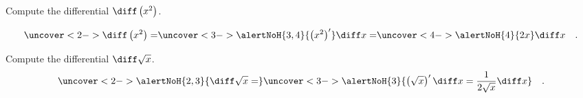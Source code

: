 \begin{frame}
\begin{example}
Compute the differential $\diff \left( x^2\right)$.

\[
\uncover<2->{\diff\left(x^2\right)=}\uncover<3->{ \alertNoH{3,4}{\left(x^2\right)'} \diff x=} \uncover<4->{\alertNoH{4}{2x} \diff x\quad .}
\]
\end{example}
\end{frame}
\begin{frame}
\begin{example}
Compute the differential $\diff  \sqrt{x}$.
\[
\uncover<2->{\alertNoH{2,3}{\diff \sqrt{x}=}}\uncover<3->{\alertNoH{3}{\left(\sqrt{x}\right)'\diff  x=  \frac{1}{2\sqrt{x}} \diff x }\quad .}
\]
\end{example}
\end{frame}

